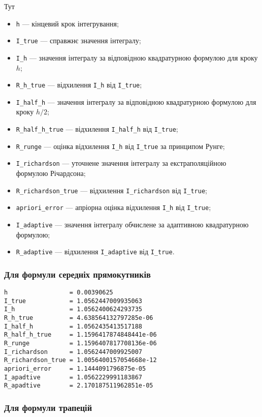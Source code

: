 Тут 

\begin{itemize}
	\item {\tt h} --- кінцевий крок інтегрування;
	\item {\tt I\_true} --- справжнє значення інтегралу;
	\item {\tt I\_h} --- значення інтегралу за відповідною квадратурною формулою для кроку $h$;
	\item {\tt R\_h\_true} --- відхилення {\tt I\_h} від {\tt I\_true};
	\item {\tt I\_half\_h} --- значення інтегралу за відповідною квадратурною формулою для кроку $h / 2$;
	\item {\tt R\_half\_h\_true} --- відхилення {\tt I\_half\_h} від {\tt I\_true};
	\item {\tt R\_runge} --- оцінка відхилення {\tt I\_h} від {\tt I\_true} за принципом Рунге;
	\item {\tt I\_richardson} --- уточнене значення інтегралу за екстраполяційною формулою Річардсона;
	\item {\tt R\_richardson\_true} --- відхилення {\tt I\_richardson} від {\tt I\_true};
	\item {\tt apriori\_error} --- апріорна оцінка відхилення {\tt I\_h} від {\tt I\_true};
	\item {\tt I\_adaptive} --- значення інтегралу обчислене за адаптивною квадратурною формулою;
	\item {\tt R\_adaptive} ---  відхилення {\tt I\_adaptive} від {\tt I\_true}.
\end{itemize}

\subsubsection{Для формули середніх прямокутників}

\begin{verbatim}
h                 = 0.00390625
I_true            = 1.0562447009935063
I_h               = 1.0562400624293735
R_h_true          = 4.638564132797285e-06
I_half_h          = 1.0562435413517188
R_half_h_true     = 1.1596417874848441e-06
R_runge           = 1.1596407817708136e-06
I_richardson      = 1.0562447009925007
R_richardson_true = 1.0056400157054668e-12
apriori_error     = 1.1444091796875e-05
I_apadtive        = 1.0562229991183867
R_apadtive        = 2.170187511962851e-05
\end{verbatim}

\subsubsection{Для формули трапецій}

